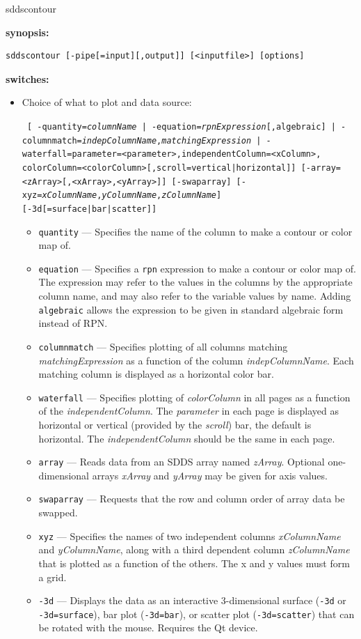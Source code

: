 \begin{sddsprog}{sddscontour}
  \item \textbf{synopsis:}
  \begin{verbatim}
sddscontour [-pipe[=input][,output]] [<inputfile>] [options]
  \end{verbatim}
  \item \textbf{switches:}
    \begin{itemize}
    \item Choice of what to plot and data source:
\begin{flushleft}{\tt
[{ -quantity={\em columnName} | -equation={\em rpnExpression}[,algebraic] |
  -columnmatch={\em indepColumnName},{\em matchingExpression}} |
 -waterfall=parameter=<parameter>,independentColumn=<xColumn>,
             colorColumn=<colorColumn>[,scroll=vertical|horizontal]]
[-array=<zArray>[,<xArray>,<yArray>]] [-swaparray]
[-xyz={\em xColumnName},{\em yColumnName},{\em zColumnName}]
[-3d[=surface|bar|scatter]]
}\end{flushleft}
\begin{itemize}
        \item \verb|quantity| --- Specifies the name of the column to make a contour or color map of.
        \item \verb|equation| --- Specifies a \verb|rpn| expression to make a contour or color map of.
        The expression may refer to the values in the columns by the appropriate column name, and may
        also refer to the variable values by name.  Adding \verb|algebraic| allows the
        expression to be given in standard algebraic form instead of RPN.
        \item \verb|columnmatch| --- Specifies plotting of all columns matching {\em matchingExpression}
        as a function of the column {\em indepColumnName}.  Each matching column is displayed as a horizontal
        color bar.
        \item \verb|waterfall| --- Specifies plotting of {\em colorColumn} in all pages as a function of the
        {\em independentColumn}. The {\em parameter} in each page is displayed as horizontal or vertical (provided
        by the {\em scroll}) bar, the default is horizontal. The {\em independentColumn} should be the same in
        each page.
        \item \verb|array| --- Reads data from an SDDS array named {\em zArray}.  Optional one-dimensional arrays
          {\em xArray} and {\em yArray} may be given for axis values.
        \item \verb|swaparray| --- Requests that the row and column order of array data be swapped.
        \item \verb|xyz| --- Specifies the names of two independent columns {\em xColumnName} and {\em yColumnName}, along with
          a third dependent column {\em zColumnName} that is plotted as a function of the others.
          The x and y values must form a grid.
        \item \verb|-3d| --- Displays the data as an interactive 3-dimensional surface (\verb|-3d| or \verb|-3d=surface|), bar plot (\verb|-3d=bar|), or scatter plot (\verb|-3d=scatter|) that can be rotated with the mouse. Requires the Qt device.
        \end{itemize}


\end{itemize}
\end{sddsprog}
